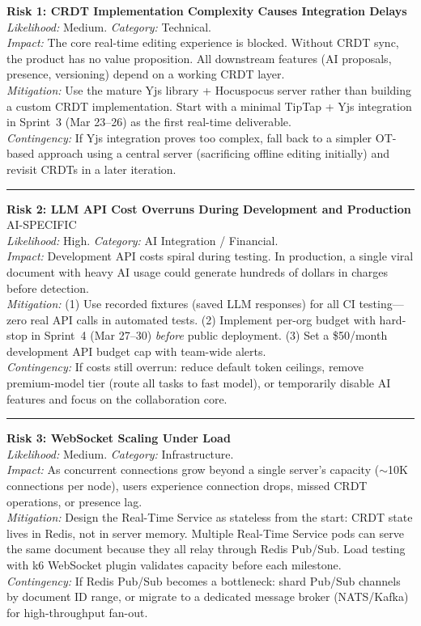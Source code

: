 \documentclass[10pt, a4paper]{article}
\newcommand{\lightrule}{{\color{border}\rule{\textwidth}{0.4pt}}}
\begin{document}
\vspace{4pt}
{\small

\noindent\textbf{Risk 1: CRDT Implementation Complexity Causes Integration Delays}\\
\textit{Likelihood:} Medium. \textit{Category:} Technical.\\
\textit{Impact:} The core real-time editing experience is blocked. Without CRDT sync, the product has no value proposition. All downstream features (AI proposals, presence, versioning) depend on a working CRDT layer.\\
\textit{Mitigation:} Use the mature Yjs library + Hocuspocus server rather than building a custom CRDT implementation. Start with a minimal TipTap + Yjs integration in Sprint~3 (Mar 23--26) as the first real-time deliverable.\\
\textit{Contingency:} If Yjs integration proves too complex, fall back to a simpler OT-based approach using a central server (sacrificing offline editing initially) and revisit CRDTs in a later iteration.

\lightrule
\vspace{4pt}
\noindent\textbf{Risk 2: LLM API Cost Overruns During Development and Production} \hfill {\footnotesize\color{danger}\textsf{AI-SPECIFIC}}\\
\textit{Likelihood:} High. \textit{Category:} AI Integration / Financial.\\
\textit{Impact:} Development API costs spiral during testing. In production, a single viral document with heavy AI usage could generate hundreds of dollars in charges before detection.\\
\textit{Mitigation:} (1) Use recorded fixtures (saved LLM responses) for all CI testing---zero real API calls in automated tests. (2) Implement per-org budget with hard-stop in Sprint~4 (Mar 27--30) \emph{before} public deployment. (3) Set a \$50/month development API budget cap with team-wide alerts.\\
\textit{Contingency:} If costs still overrun: reduce default token ceilings, remove premium-model tier (route all tasks to fast model), or temporarily disable AI features and focus on the collaboration core.

\lightrule
\vspace{4pt}
\noindent\textbf{Risk 3: WebSocket Scaling Under Load}\\
\textit{Likelihood:} Medium. \textit{Category:} Infrastructure.\\
\textit{Impact:} As concurrent connections grow beyond a single server's capacity ($\sim$10K connections per node), users experience connection drops, missed CRDT operations, or presence lag.\\
\textit{Mitigation:} Design the Real-Time Service as stateless from the start: CRDT state lives in Redis, not in server memory. Multiple Real-Time Service pods can serve the same document because they all relay through Redis Pub/Sub. Load testing with k6 WebSocket plugin validates capacity before each milestone.\\
\textit{Contingency:} If Redis Pub/Sub becomes a bottleneck: shard Pub/Sub channels by document ID range, or migrate to a dedicated message broker (NATS/Kafka) for high-throughput fan-out.

}
\end{document}
